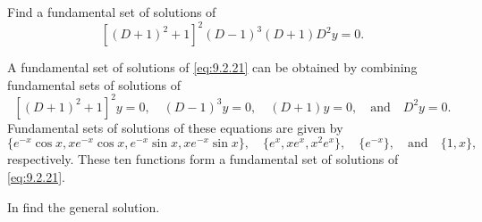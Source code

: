 \begin{example}\label{example:9.2.8}
Find a fundamental set of solutions of
\begin{equation} \label{eq:9.2.21}
[(D+1)^2+1]^2(D-1)^3(D+1)D^2y=0.
\end{equation}
\end{example}

\begin{solution}
A fundamental set of solutions of \eqref{eq:9.2.21} can be
obtained by combining fundamental sets of solutions of
\[
\left[(D+1)^2+1\right]^2 y=0,
\quad (D-1)^3 y=0,
\quad (D+1)y=0,
\quad\text{and}
\quad D^2y=0.
\]
Fundamental sets of solutions of these equations are given by
\[
\{e^{-x}\cos x, xe^{-x}\cos x, e^{-x}\sin x, xe^{-x}\sin x\},
\quad \{e^x, xe^x, x^2e^x\},%
\quad\{e^{-x}\},
\quad\text{and}
\quad\{1,x\},
\]
respectively. These ten functions form a fundamental set of solutions
of \eqref{eq:9.2.21}.
\end{solution}

 \exercises
 In  find the general
solution.

